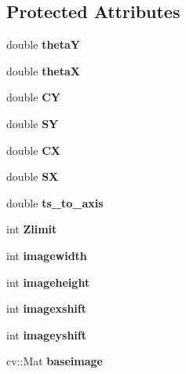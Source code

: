 \subsection*{Protected Attributes}
\begin{DoxyCompactItemize}
\item 
\mbox{\label{classev_1_1isoDraw_aa2e02ca38ca08436fed9710f16a68cc0}} 
double {\bfseries thetaY}
\item 
\mbox{\label{classev_1_1isoDraw_a84f3c0bfdeeaa5d87e34bb2b515c8f68}} 
double {\bfseries thetaX}
\item 
\mbox{\label{classev_1_1isoDraw_a7bd0a4b981347fd910ef6b1105a1e44c}} 
double {\bfseries CY}
\item 
\mbox{\label{classev_1_1isoDraw_a8bc247333b8bf395ef587da07e91e6c1}} 
double {\bfseries SY}
\item 
\mbox{\label{classev_1_1isoDraw_a04de977fa3e40414ef08261bbce7d625}} 
double {\bfseries CX}
\item 
\mbox{\label{classev_1_1isoDraw_a7bb0a3450b029f16162c3b2384fdcdbb}} 
double {\bfseries SX}
\item 
\mbox{\label{classev_1_1isoDraw_a581e58c379835002d7118d07b051b825}} 
double {\bfseries ts\+\_\+to\+\_\+axis}
\item 
\mbox{\label{classev_1_1isoDraw_a817091f39e3c95e92064527c22e239f1}} 
int {\bfseries Zlimit}
\item 
\mbox{\label{classev_1_1isoDraw_a19bb2e090dffb88145fbd976064a1438}} 
int {\bfseries imagewidth}
\item 
\mbox{\label{classev_1_1isoDraw_a7ee831adfe4c3dc13718b158a6e53ae8}} 
int {\bfseries imageheight}
\item 
\mbox{\label{classev_1_1isoDraw_ac105029057405105a559f119b6a794db}} 
int {\bfseries imagexshift}
\item 
\mbox{\label{classev_1_1isoDraw_a250c4a31d28b85f4151d7a92b02fc0d3}} 
int {\bfseries imageyshift}
\item 
\mbox{\label{classev_1_1isoDraw_ae1d11e5f0c8bf377b8c90474aa9705b6}} 
cv\+::\+Mat {\bfseries baseimage}
\end{DoxyCompactItemize}


